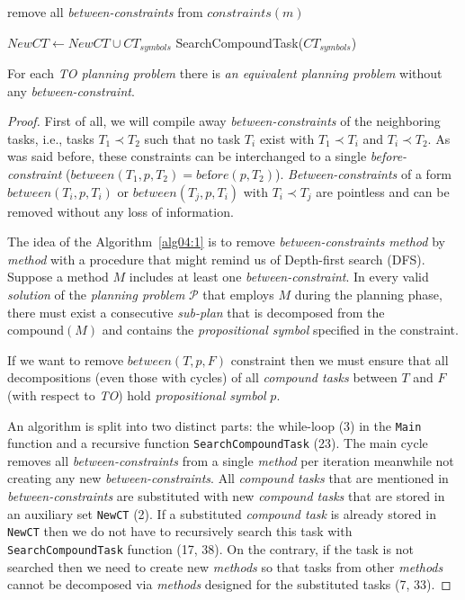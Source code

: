 \begin{algorithm}
\begin{algorithmic}[1]
                \State remove all \emph{between-constraints} from $constraints(m)$

                    \State $NewCT \gets NewCT \cup CT_{symbols}$
                    \State SearchCompoundTask($CT_{symbols}$)
                \EndFor
            \EndFor
        \EndProcedure
    \end{algorithmic}
\end{algorithm}

\begin{thm}\label{thm04:9}
    For each \emph{TO planning problem} there is \emph{an equivalent planning problem} without any \emph{between-constraint}.
\end{thm}
\begin{proof}
    First of all, we will compile away \emph{between-constraints} of the neighboring tasks, i.e., tasks $T_1 \prec T_2$ such that no task $T_i$ exist with $T_1 \prec T_i$ and $T_i \prec T_2$. As was said before, these constraints can be interchanged to a single \emph{before-constraint} ($between(T_1, p, T_2) = be\text{f}ore(p, T_2)$). \emph{Between-constraints} of a form $between(T_i, p, T_i)$ or $between(T_j, p, T_i)$ with $T_i \prec T_j$ are pointless and can be removed without any loss of information.
    
    The idea of the Algorithm~\ref{alg04:1} is to remove \emph{between-constraints} \emph{method} by \emph{method} with a procedure that might remind us of Depth-first search (DFS). Suppose a method \( M \) includes at least one \emph{between-constraint}. In every valid \emph{solution} of the \emph{planning problem} \(\mathcal{P}\) that employs \( M \) during the planning phase, there must exist a consecutive \emph{sub-plan} that is decomposed from the \( \text{compound}(M) \) and contains the \emph{propositional symbol} specified in the constraint.

    If we want to remove $between(T, p, F)$ constraint then we must ensure that all decompositions (even those with cycles) of all \emph{compound tasks} between $T$ and $F$ (with respect to \emph{TO}) hold \emph{propositional symbol} $p$.
    
    An algorithm is split into two distinct parts: the while-loop (3) in the \texttt{Main} function and a recursive function \texttt{SearchCompoundTask} (23). The main cycle removes all \emph{between-constraints} from a single \emph{method} per iteration meanwhile not creating any new \emph{between-constraints}. All \emph{compound tasks} that are mentioned in \emph{between-constraints} are substituted with new \emph{compound tasks} that are stored in an auxiliary set \texttt{NewCT} (2). If a substituted \emph{compound task} is already stored in \texttt{NewCT} then we do not have to recursively search this task with \texttt{SearchCompoundTask} function (17, 38). On the contrary, if the task is not searched then we need to create new \emph{methods} so that tasks from other \emph{methods} cannot be decomposed via \emph{methods} designed for the substituted tasks (7, 33).


\end{proof}
